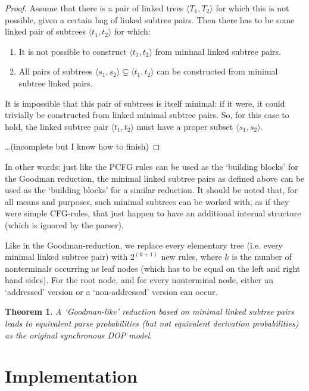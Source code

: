 \documentclass[a4paper]{article}
\newtheorem{theorem}{Theorem}[section]
\theoremstyle{definition}
\begin{document}
\begin{proof}

Assume that there is a pair of linked trees $\langle T_1, T_2 \rangle$ for
which this is not possible, given a certain bag of linked subtree pairs. Then
there has to be some linked pair of subtrees $\langle t_1, t_2 \rangle$ for
which:

\begin{enumerate}
\item It is not possible to construct $\langle t_1, t_2 \rangle$ from minimal
	linked subtree pairs.
\item All pairs of subtrees $\langle s_1, s_2 \rangle \subsetneq \langle t_1,
	t_2 \rangle$ can be constructed from minimal subtree linked pairs.
\end{enumerate}

It is impossible that this pair of subtrees is itself minimal: if it were, it
could trivially be constructed from linked minimal subtree pairs. So, for this
case to hold, the linked subtree pair $\langle t_1, t_2 \rangle$ must have a
proper subset $\langle s_1, s_2 \rangle$.

\ldots (incomplete but I know how to finish)

\end{proof}

In other words: just like the PCFG rules can be used as the `building blocks'
for the Goodman reduction, the minimal linked subtree pairs as defined above
can be used as the `building blocks' for a similar reduction. It should be
noted that, for all means and purposes, such minimal subtrees can be worked
with, as if they were simple CFG-rules, that just happen to have an additional
internal structure (which is ignored by the parser).

Like in the Goodman-reduction, we replace every elementary tree (i.e. every
minimal linked subtree pair) with $2^{(k+1)}$ new rules, where $k$ is the
number of nonterminals occurring as leaf nodes (which has to be equal on the
left and right hand sides). For the root node, and for every nonterminal node,
either an `addressed' version or a `non-addressed' version can occur.

\begin{theorem}
A `Goodman-like' reduction based on minimal linked subtree pairs leads to
equivalent parse probabilities (but not equivalent derivation probabilities) as
the original synchronous DOP model.
\end{theorem}

\section{Implementation}
\label{sec:implem}
\end{document}
